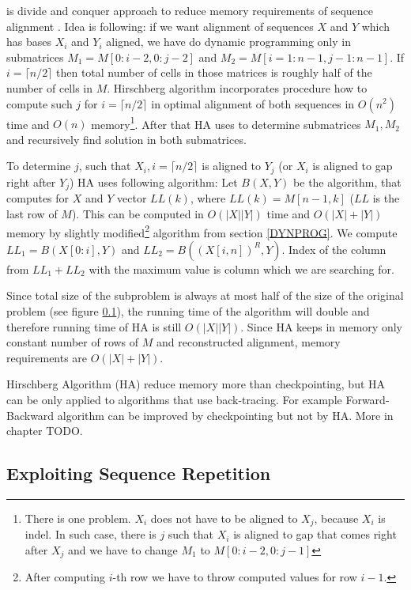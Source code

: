  is divide and conquer approach to reduce
memory requirements of sequence alignment \cite{Hirschberg1975}. Idea is
following: if we want alignment of sequences $X$ and $Y$ which has bases $X_i$
and $Y_i$ aligned, we have do dynamic programming only in submatrices
$M_1=M[0:i-2,0:j-2]$ and $M_2=M[i=1:n-1,j-1:n-1]$. If $i=\lceil n/2\rceil$ then
total number of cells in those matrices is roughly half of the number of cells
in $M$. Hirschberg algorithm incorporates procedure how to compute such $j$ for
$i=\lceil n/2\rceil$ in optimal alignment of both sequences in $O(n^2)$ time and
$O(n)$ memory\footnote{There is one problem. $X_i$ does not have to be aligned
to $X_j$, because $X_i$ is indel. In such case, there is $j$ such that $X_i$ is
aligned to gap that comes right after $X_j$ and we have to change $M_1$ to
$M[0:i-2,0:j-1]$}. After that HA uses to determine submatrices $M_1,M_2$ and
recursively find solution in both submatrices.

To determine $j$, such that $X_i,i=\lceil n/2\rceil$ is aligned to $Y_j$ (or
$X_i$ is aligned to gap right after $Y_j$) HA uses following algorithm: Let
$B(X,Y)$ be the algorithm, that computes for $X$ and $Y$ vector $LL(k)$, where
$LL(k)=M[n-1,k]$ ($LL$ is the last row of $M$). This can be computed in
$O(|X||Y|)$ time and $O(|X|+|Y|)$ memory by slightly modified\footnote{After
computing $i$-th row we have to throw computed values for row $i-1$.} algorithm
from section \ref{DYNPROG}.  We compute $LL_1=B(X[0:i],Y)$ and $LL_2=B(
(X[i,n])^R,Y)$. Index of the column from $LL_1+LL_2$ with the maximum value is
column which we are searching for. 

Since total size of the subproblem is always at most half of the size of the
original problem (see figure \ref{}), the running time of the algorithm will
double and therefore running time of HA is still $O(|X||Y|)$. Since HA keeps in
memory only constant number of rows of $M$ and reconstructed alignment, memory
requirements are $O(|X|+|Y|)$.

Hirschberg Algorithm (HA) reduce memory more than checkpointing, but HA can be
only applied to algorithms that use back-tracing. For example Forward-Backward
algorithm can be improved by checkpointing but not by HA. More in chapter TODO.

\subsection{Exploiting Sequence Repetition}

